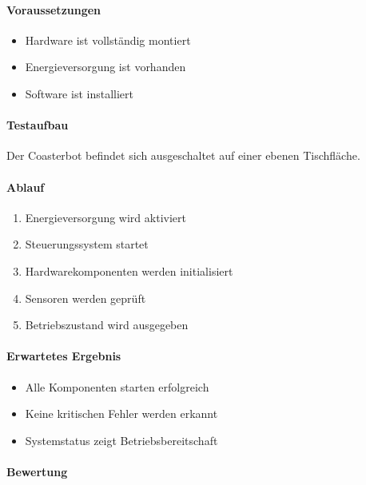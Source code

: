 \paragraph{Voraussetzungen}\label{voraussetzungen-23}

\begin{itemize}
\tightlist
\item
  Hardware ist vollständig montiert
\item
  Energieversorgung ist vorhanden
\item
  Software ist installiert
\end{itemize}

\paragraph{Testaufbau}\label{testaufbau}

Der Coasterbot befindet sich ausgeschaltet auf einer ebenen Tischfläche.

\paragraph{Ablauf}\label{ablauf-24}

\begin{enumerate}
\def\labelenumi{\arabic{enumi}.}
\tightlist
\item
  Energieversorgung wird aktiviert
\item
  Steuerungssystem startet
\item
  Hardwarekomponenten werden initialisiert
\item
  Sensoren werden geprüft
\item
  Betriebszustand wird ausgegeben
\end{enumerate}

\paragraph{Erwartetes Ergebnis}\label{erwartetes-ergebnis-24}

\begin{itemize}
\tightlist
\item
  Alle Komponenten starten erfolgreich
\item
  Keine kritischen Fehler werden erkannt
\item
  Systemstatus zeigt Betriebsbereitschaft
\end{itemize}

\paragraph{Bewertung}\label{bewertung-24}


